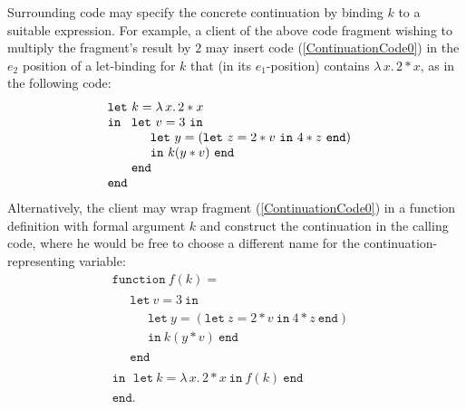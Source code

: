 Surrounding code may specify the concrete continuation by binding $k$
to a suitable expression. For example, a client of the above code
fragment wishing to multiply the fragment's result by $2$ may insert
code (\ref{ContinuationCode0}) in the $e_2$ position of a let-binding
for $k$ that (in its $e_1$-position) contains $\lambda\, x .\, 2* x$,
as in the following code: 
$$\begin{array}{l}
\mathtt{let}\ k = \lambda\, x .\, 2* x\\ 
\mathtt{in}\ 
  \begin{array}[t]{l}
    \mathtt{let}\ v = 3\ \mathtt{in}\\
    \quad \begin{array}{l} 
      \mathtt{let}\ y = (\mathtt{let}\ z=2*v \ \mathtt{in}\ 4*z\ \mathtt{end})\\
      \mathtt{in}\ k (y*v)\ \mathtt{end}
    \end{array}\\
    \mathtt{end}
  \end{array}\\ 
\mathtt{end}
\end{array}
$$ 
Alternatively, the client may wrap fragment (\ref{ContinuationCode0})
in a function definition with formal argument $k$ and construct the
continuation in the calling code, where he would be free to choose a
different name for the continuation-representing variable:
\begin{equation}
\label{ContinuationCode1}
\begin{array}{l}
\mathtt{function}\ f (k) =\\
\quad 
\begin{array}{l}
  \mathtt{let}\ v = 3\ \mathtt{in}\\
  \quad \begin{array}{l} 
    \mathtt{let}\ y = (\mathtt{let}\ z=2*v \ \mathtt{in}\ 4*z\ \mathtt{end})\\
    \mathtt{in}\ k (y*v)\ \mathtt{end}
  \end{array}\\
  \mathtt{end}
  \end{array}\\
\mathtt{in}\
  \begin{array}{l}
  \mathtt{let}\ k = \lambda\, x .\, 2* x\ \mathtt{in}\ f(k)\ \mathtt{end}
  \end{array}\\
\mathtt{end}.
\end{array}
\end{equation}

